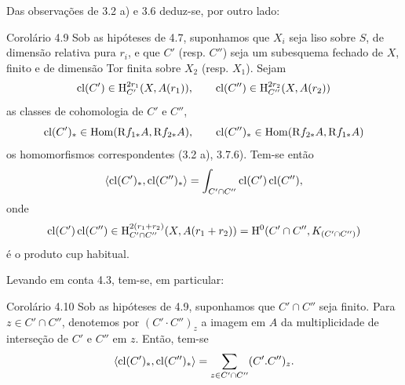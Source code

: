 Das observações de 3.2 a) e 3.6 deduz-se, por outro lado:

\begin{statement}{Corolário 4.9}
Sob as hipóteses de 4.7, suponhamos que $X_i$ seja liso sobre $S$, de dimensão relativa pura $r_i$, e que $C'$ (resp. $C''$) seja um subesquema fechado de $X$, finito e de dimensão Tor finita sobre $X_2$ (resp. $X_1$). Sejam
\[
\operatorname{cl}(C')\in \mathrm{H}_{C'}^{2r_1}(X,A(r_1)),\qquad
\operatorname{cl}(C'')\in \mathrm{H}_{C''}^{2r_2}(X,A(r_2))
\]
as classes de cohomologia de $C'$ e $C''$,
\[
\operatorname{cl}(C')_*\in\operatorname{Hom}(\mathrm{R} f_{1*}A,\mathrm{R} f_{2*}A),\qquad
\operatorname{cl}(C'')_*\in\operatorname{Hom}(\mathrm{R} f_{2*}A,\mathrm{R} f_{1*}A)
\]
os homomorfismos correspondentes (3.2 a), 3.7.6). Tem-se então
\[
\langle \operatorname{cl}(C')_*,\operatorname{cl}(C'')_*\rangle
=
\int_{C'\cap C''}\operatorname{cl}(C')\operatorname{cl}(C''),
\]
onde
\[
\operatorname{cl}(C')\operatorname{cl}(C'')\in
\mathrm{H}_{C'\cap C''}^{2(r_1+r_2)}(X,A(r_1+r_2))
=
\mathrm{H}^0(C'\cap C'',K_{(C'\cap C'')})
\]
é o produto cup habitual.
\end{statement}

Levando em conta 4.3, tem-se, em particular:

\begin{statement}{Corolário 4.10}
Sob as hipóteses de 4.9, suponhamos que $C'\cap C''$ seja finito. Para $z\in C'\cap C''$, denotemos por $(C'\!\cdot C'')_z$ a imagem em $A$ da multiplicidade de interseção de $C'$ e $C''$ em $z$. Então, tem-se
\[
\langle \operatorname{cl}(C')_*,\operatorname{cl}(C'')_*\rangle
=
\sum_{z\in C'\cap C''}(C'.C'')_z.
\]
\end{statement}

